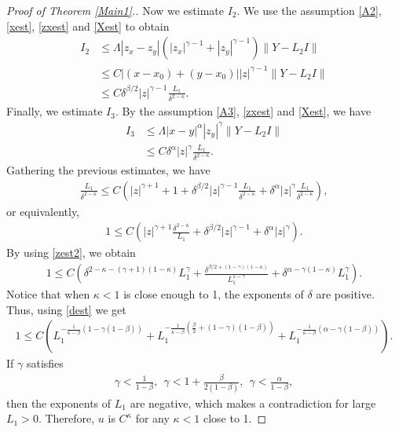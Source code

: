 \documentclass[reqno]{amsart}
\theoremstyle{plain}
\theoremstyle{definition}
\theoremstyle{remark}
\newcommand{\norm}[1]{\left\lVert#1\right\rVert}
\numberwithin{equation}{section}
\begin{document}
\begin{proof}[Proof of Theorem \ref{Main1}.]
     Now we estimate $I_2$.
     We use the assumption \ref{A2}, \eqref{xest}, \eqref{zxest} and \eqref{Xest} to obtain
     \begin{align*}
         I_2 &\leq \Lambda|z_x-z_y|(|z_x|^{\gamma-1}+|z_y|^{\gamma-1}) \norm{Y-L_2I} \\
         &\leq C|(x-x_0)+(y-x_0)||z|^{\gamma-1}\norm{Y-L_2I} \\
         &\leq C\delta^{\beta/2}|z|^{\gamma-1}\frac{L_1}{\delta^{2-\kappa}}.
     \end{align*}
     Finally, we estimate $I_3$.
     By the assumption \ref{A3}, \eqref{zxest} and \eqref{Xest}, we have
     \begin{align*}
         I_3 &\leq \Lambda|x-y|^\alpha|z_y|^\gamma \norm{Y-L_2I} \\
         &\leq C\delta^\alpha |z|^\gamma\frac{L_1}{\delta^{2-\kappa}}.
     \end{align*}
     Gathering the previous estimates, we have
     \begin{align*}
         \frac{L_1}{\delta^{2-\kappa}} \leq C\left(|z|^{\gamma+1}+1 + \delta^{\beta/2}|z|^{\gamma-1}\frac{L_1}{\delta^{2-\kappa}} + \delta^\alpha |z|^\gamma\frac{L_1}{\delta^{2-\kappa}}\right),
     \end{align*}
     or equivalently,
     \begin{align*}
         1 \leq C\left(|z|^{\gamma+1} \frac{\delta^{2-\kappa}}{L_1} + \delta^{\beta/2}|z|^{\gamma-1} + \delta^\alpha |z|^{\gamma}\right).
     \end{align*}
     By using \eqref{zest2}, we obtain
     \begin{align*}
         1 \leq C\left( \delta^{2-\kappa -(\gamma+1)(1-\kappa)}L_1^{\gamma} + \frac{\delta^{\beta/2 + (1-\gamma)(1-\kappa)}}{L_1^{1-\gamma}} + \delta^{\alpha - \gamma(1-\kappa)}L_1^\gamma \right).
     \end{align*}
     Notice that when $\kappa <1$ is close enough to 1, the exponents of $\delta$ are positive.
     Thus, using \eqref{dest} we get
     \begin{align*}
         1 \leq C\left( L_1^{-\frac{1}{\kappa-\beta}\left(1-\gamma(1-\beta)\right) }+L_1^{-\frac{1}{\kappa-\beta}\left(\frac{\beta}{2} + (1-\gamma)(1-\beta)\right)} + L_1^{-\frac{1}{\kappa-\beta}(\alpha - \gamma(1-\beta))} \right).
     \end{align*}
     If $\gamma$ satisfies
     \begin{align*}
         \gamma < \frac{1}{1-\beta}, \ \ \gamma < 1+\frac{\beta}{2(1-\beta)}, \ \ \gamma <\frac{\alpha}{1-\beta},
     \end{align*}
     then the exponents of $L_1$ are negative, which makes a contradiction for large $L_1>0$.
     Therefore, $u$ is $C^\kappa$ for any $\kappa<1$ close to 1.
     

\end{proof}
\end{document}

